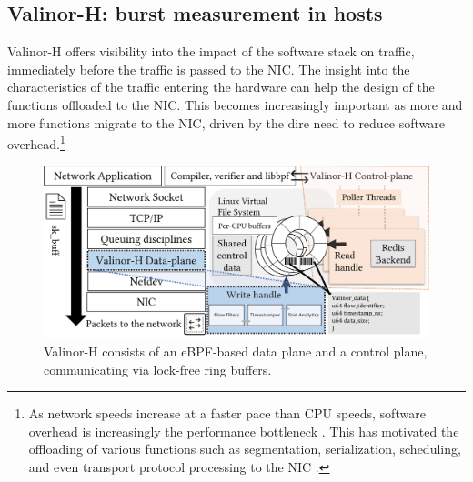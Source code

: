 \subsection{Valinor-H: burst measurement in hosts}
\label{sec:host}
Valinor-H offers visibility into the impact of the software stack on traffic, immediately before the traffic is passed to the NIC. The insight into the characteristics of the traffic entering the hardware can help the design of the functions offloaded to the NIC. This becomes increasingly important as more and more functions migrate to the NIC, driven by the dire need to reduce software overhead.\footnote{As network speeds increase at a faster pace than CPU speeds, software overhead is increasingly the performance bottleneck \cite{homa-impl}. This has motivated the offloading of various functions such as segmentation, serialization, scheduling, and even transport protocol processing to the NIC \cite{programmable-transport,loom,breakfast}.}

\begin{figure}
    \centering
    	\includegraphics[width=0.85\linewidth]{figs/ebpf-crop.pdf}
    \caption{\small{Valinor-H consists of an eBPF-based data plane and a control plane, communicating via lock-free ring buffers.}}
	\label{fig:bpf}
\end{figure}

